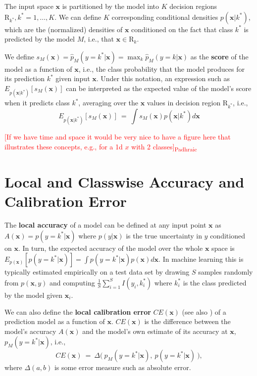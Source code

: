\documentclass{article}
\newcommand{\ux}{{\mathbf{x}}}
\newcommand{\padhraic}[1]{\textcolor{Red}{[#1]\textsubscript{Padhraic}}}
\newcommand{\robby}[1]{\textcolor{Red}{[#1]\textsubscript{Robby}}}
\begin{document}
The input space $\ux$ is partitioned by the model into $K$ decision regions $\mbox{R}_{k^*},  k^* = 1,\ldots,K$.
We can define $K$ corresponding conditional densities  $p(\ux | k^*)$, which are the (normalized) densities of $\ux$ conditioned on the fact that class $k^*$ is predicted by the model $M$, i.e., that $\ux \in \mbox{R}_k$.


We define $s_M(\ux) = \hat{p}_M(y = k^*| \ux) = \max_k \hat{p}_M(y = k | \ux)$ as the {\bf score} of the model as a function of $\ux$, i.e., the class probability that the model produces for its prediction $k^*$  given input $\ux$.
Under this notation, an expression such as $E_{p(\ux | k^*)}[s_M(\ux)]$ can be interpreted as the expected value of the model's score when it predicts class $k^*$, averaging over the $\ux$ values in decision region $\mbox{R}_{k^*}$, i.e.,
\[
    E_{p(\ux | k^*)}[s_M(\ux)] \ = \ \int s_M(\ux) p(\ux | k^*) d\ux
\]

\padhraic{If we have time and space it would be very nice to have a figure here that illustrates these concepts, e.g., for a 1d $x$ with 2 classes}

\section{Local and Classwise Accuracy and Calibration Error}  

The {\bf local accuracy} of a model can be defined at any input point $\ux$ as $A(\ux) = p(y = k^*| \ux)$ where $p(y | \ux)$ is the true uncertainty in $y$ conditioned on $\ux$.
In turn, the expected accuracy of the model over the whole $\ux$ space is $E_{p(\ux)}[p(y = k^*| \ux)] = \int p(y = k^*| \ux) p(\ux) d\ux$.
In machine learning this is typically estimated empirically on a test data set by drawing $S$ samples randomly from $p(\ux,y)$ and computing $\frac{1}{S} \sum_{i=1}^S I(y_i, k_i^*)$ where $k_i^*$ is the class predicted by the model given $\ux_i$.

We can also define the {\bf local calibration error} $CE(\ux)$ (see also \citet{vaicenavicius19a}) of a prediction model as a function of $\ux$.
$CE(\ux)$ is the difference between the model's accuracy $A(\ux)$ and the model's own estimate of its accuracy at $\ux$, $p_M(y = k^*| \ux)$, i.e.,
\[
    CE(\ux) \ = \  \Delta\bigl(\ p_M(y = k^*| \ux), \  p(y =k^*| \ux) \  \bigr),
\]
where $\Delta(a,b)$ is some error measure such as absolute error. %
\end{document}
